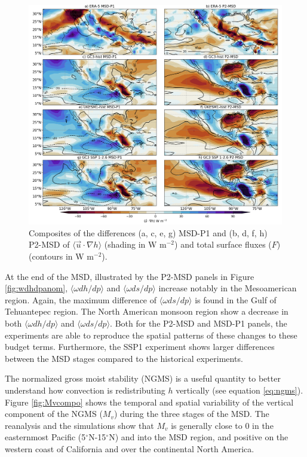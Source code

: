 \begin{figure}[t!]
\includegraphics[width=\linewidth]{figures/thermocompositeint_udothanom.png}
\caption[Composites of the anomalous horizontal advection of MSE and surface fluxes]{Composites of the differences (a, c, e, g) MSD-P1 and (b, d, f, h) P2-MSD of $\langle \vec{u}\cdot\nabla h \rangle$ (shading in W m$^{-2}$) and total surface fluxes ($F$) (contours in W m$^{-2}$).  }
\label{fig:intudothanom}
\end{figure} 
  
 
 At the end of the MSD, illustrated by the P2-MSD panels in Figure \ref{fig:wdhdpanom}, $\langle \omega dh/dp \rangle$ and $\langle \omega ds/dp \rangle$ increase notably in the Mesoamerican region. Again, the maximum difference of $\langle \omega ds/dp \rangle$ is found in the Gulf of Tehuantepec region. The North American monsoon region show a decrease in both $\langle \omega dh/dp \rangle$ and $\langle \omega ds/dp \rangle$. 
 Both for the P2-MSD and MSD-P1 panels, the experiments are able to reproduce the spatial patterns of these changes to these budget terms. Furthermore, the SSP1 experiment shows larger differences between the MSD stages compared to the historical experiments.

The normalized gross moist stability (NGMS) is a useful quantity to better understand how convection is redistributing $h$ vertically (see equation \ref{eq:ngms}). Figure \ref{fig:Mvcompo} shows the temporal and spatial variability of the vertical component of the NGMS ($M_v$) during the three stages of the MSD. The reanalysis and the simulations show that $M_v$ is generally close to 0 in the easternmost Pacific (5$^\circ$N-15$^\circ$N) and into the MSD region, and positive on the western coast of California and over the continental North America.

